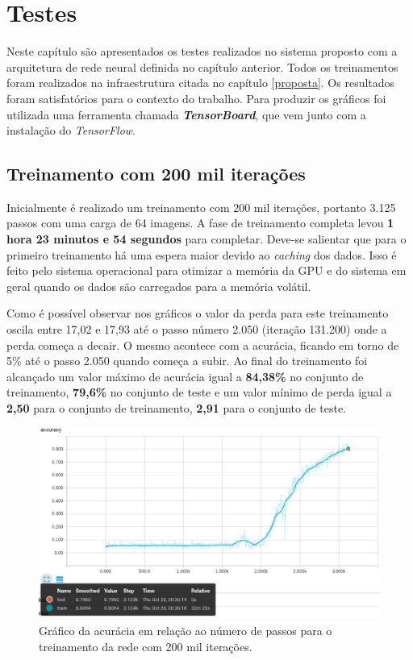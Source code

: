 \chapter{ Testes }

Neste capítulo são apresentados os testes realizados no sistema
proposto com a arquitetura de rede neural definida no capítulo
anterior. Todos os treinamentos foram realizados na infraestrutura
citada no capítulo \ref{proposta}. Os resultados foram satisfatórios
para o contexto do trabalho. Para produzir os gráficos foi utilizada
uma ferramenta chamada {\bf \emph{TensorBoard}}, que vem junto com a
instalação do \textit{TensorFlow}.

\section{Treinamento com 200 mil iterações}

Inicialmente é realizado um treinamento com 200 mil iterações, portanto
3.125 passos com uma carga de 64 imagens. A fase de treinamento
completa levou {\bf 1 hora 23 minutos e 54 segundos} para
completar. Deve-se salientar que para o primeiro treinamento há uma
espera maior devido ao \textit{caching} dos dados. Isso é feito pelo
sistema operacional para otimizar a memória da GPU e do sistema em
geral quando os dados são carregados para a memória volátil. 

Como é possível observar nos gráficos o valor da perda para este
treinamento oscila entre 17,02 e 17,93 até o passo número 2.050
(iteração 131.200) onde a perda começa a decair. O mesmo acontece com
a acurácia, ficando em torno de 5\% até o passo 2.050 quando começa a
subir. Ao final do treinamento foi alcançado um valor máximo de
acurácia igual a {\bf 84,38\%} no conjunto de treinamento, {\bf
  79,6\%} no conjunto de teste e um valor mínimo de perda igual a {\bf
  2,50} para o conjunto de treinamento, {\bf 2,91} para o conjunto de
teste.

\begin{figure}[H]
\centering
\includegraphics[scale=0.4]{imagens/accuracy_200k}
\caption{Gráfico da acurácia em relação ao número de passos para o
  treinamento da rede com 200 mil iterações.}
\label{fig:accuracy_200k}
\end{figure}

